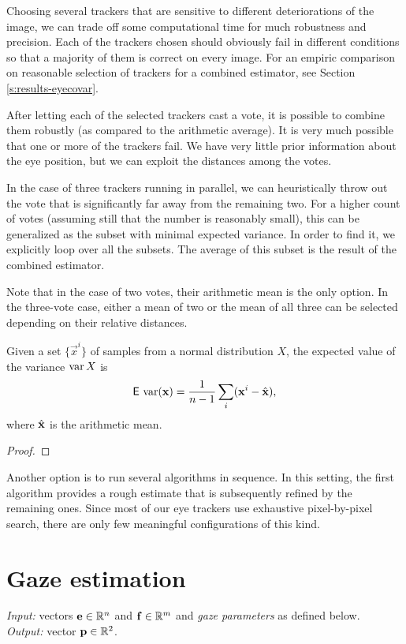 Choosing several trackers that are sensitive to different deteriorations of the image, we can trade off some computational time for much robustness and precision.
Each of the trackers chosen should obviously fail in different conditions so that a majority of them is correct on every image.
For an empiric comparison on reasonable selection of trackers for a combined estimator, see Section \ref{s:results-eyecovar}.

After letting each of the selected trackers cast a vote, it is possible to combine them robustly (as compared to the arithmetic average).
It is very much possible that one or more of the trackers fail.
We have very little prior information about the eye position, but we can exploit the distances among the votes.

In the case of three trackers running in parallel, we can heuristically throw out the vote that is significantly far away from the remaining two.
For a higher count of votes (assuming still that the number is reasonably small), this can be generalized as the subset with minimal expected variance.
In order to find it, we explicitly loop over all the subsets.
The average of this subset is the result of the combined estimator.

Note that in the case of two votes, their arithmetic mean is the only option.
In the three-vote case, either a mean of two or the mean of all three can be selected depending on their relative distances.

\begin{lemma}
Given a set $\{\vec x^i\}$ of samples from a normal distribution $X$, the expected value of the variance $\operatorname{\textrm{var}} X$ is
$$\operatorname{\textsf{E}\,}\operatorname{\textrm{var}} (\mathbf{x}) = \frac 1 {n - 1} \sum_i (\mathbf{x}^i - \hat{\mathbf{x}}),$$
where $\hat{\mathbf{x}}$ is the arithmetic mean.
\end{lemma}
\begin{proof}
\end{proof}

Another option is to run several algorithms in sequence.
In this setting, the first algorithm provides a rough estimate that is subsequently refined by the remaining ones.
Since most of our eye trackers use exhaustive pixel-by-pixel search, there are only few meaningful configurations of this kind.

\section{Gaze estimation}

\textit{Input:} vectors $\mathbf{e} \in \mathbb{R}^n$ and $\mathbf{f} \in \mathbb{R}^m$ and \textit{gaze parameters} as defined below.\\
\textit{Output:} vector $\mathbf{p} \in \mathbb{R}^2$.\\

